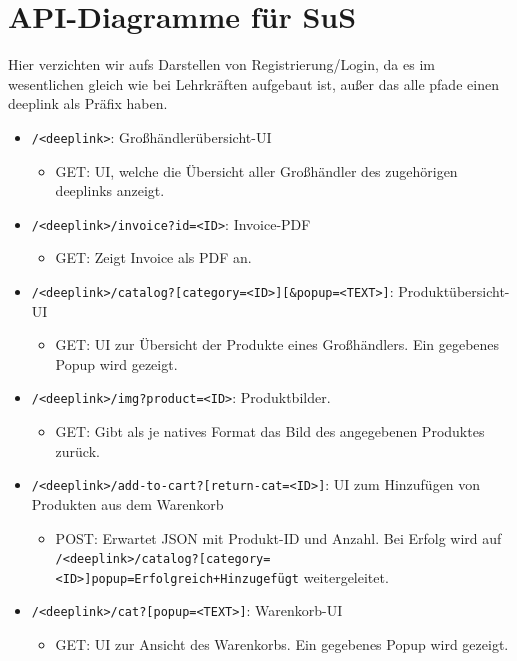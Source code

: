 \section{API-Diagramme für SuS}
Hier verzichten wir aufs Darstellen von Registrierung/Login, da es im wesentlichen gleich wie bei Lehrkräften aufgebaut ist, außer das alle pfade einen deeplink als Präfix haben.

\begin{itemize}
	\item \texttt{/<deeplink>}: Großhändlerübersicht-UI
		\begin{itemize}
			\item GET: UI, welche die Übersicht aller Großhändler des zugehörigen deeplinks anzeigt.
		\end{itemize}
	\item \texttt{/<deeplink>/invoice?id=<ID>}: Invoice-PDF
		\begin{itemize}
			\item GET: Zeigt Invoice als PDF an.
		\end{itemize}
	\item \texttt{/<deeplink>/catalog?[category=<ID>][\&popup=<TEXT>]}: Produktübersicht-UI
		\begin{itemize}
			\item GET: UI zur Übersicht der Produkte eines Großhändlers. Ein gegebenes Popup wird gezeigt.
		\end{itemize}
	\item \texttt{/<deeplink>/img?product=<ID>}: Produktbilder.
		\begin{itemize}
			\item GET: Gibt als je natives Format das Bild des angegebenen Produktes zurück.
		\end{itemize}
	\item \texttt{/<deeplink>/add-to-cart?[return-cat=<ID>]}: UI zum Hinzufügen von Produkten aus dem Warenkorb
		\begin{itemize}
			\item POST: Erwartet JSON mit Produkt-ID und Anzahl. Bei Erfolg wird auf \texttt{/<deeplink>/catalog?[category=<ID>]popup=Erfolgreich+Hinzugefügt} weitergeleitet.
		\end{itemize}
	\item \texttt{/<deeplink>/cat?[popup=<TEXT>]}: Warenkorb-UI
		\begin{itemize}
			\item GET: UI zur Ansicht des Warenkorbs. Ein gegebenes Popup wird gezeigt.
		\end{itemize}

\end{itemize}
